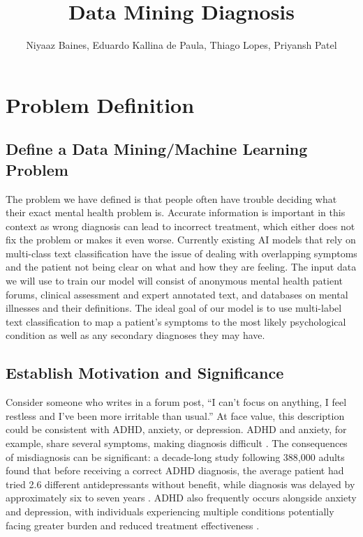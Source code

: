 \documentclass[sigconf]{acmart}
\begin{document}
\title{Data Mining Diagnosis}
\author{Niyaaz Baines, Eduardo Kallina de Paula, Thiago Lopes, Priyansh Patel}


\maketitle
\vspace{-1.5em}

\section{Problem Definition}
\subsection{Define a Data Mining/Machine Learning Problem}
The problem we have defined is that people often have trouble deciding what their exact mental health problem is. Accurate information is important in this context as wrong diagnosis can lead to incorrect treatment, which either does not fix the problem or makes it even worse. Currently existing AI models that rely on multi-class text classification have the issue of dealing with overlapping symptoms and the patient not being clear on what and how they are feeling. The input data we will use to train our model will consist of anonymous mental health patient forums, clinical assessment and expert annotated text, and databases on mental illnesses and their definitions. The ideal goal of our model is to use multi-label text classification to map a patient’s symptoms to the most likely psychological condition as well as any secondary diagnoses they may have.



\subsection{Establish Motivation and Significance}

Consider someone who writes in a forum post, “I can’t focus on anything, I feel restless and I’ve been more irritable than usual.” At face value, this description could be consistent with ADHD, anxiety, or depression. ADHD and anxiety, for example, share several symptoms, making diagnosis difficult \cite{integrativepsych2026adhdanxiety}. The consequences of misdiagnosis can be significant: a decade-long study following 388,000 adults found that before receiving a correct ADHD diagnosis, the average patient had tried 2.6 different antidepressants without benefit, while diagnosis was delayed by approximately six to seven years \cite{additude2024adhddepression}. ADHD also frequently occurs alongside anxiety and depression, with individuals experiencing multiple conditions potentially facing greater burden and reduced treatment effectiveness \cite{liu2025adhdcomorbidity}.
\end{document}
